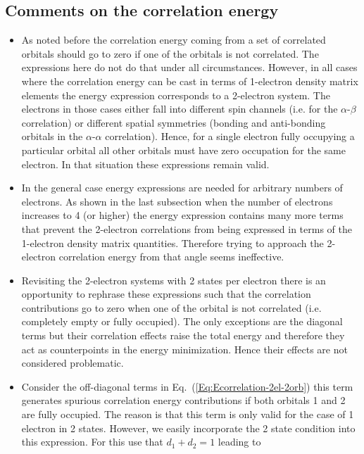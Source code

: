 \documentclass[aip,graphicx]{revtex4-1}
\begin{document}
\subsection{Comments on the correlation energy}
\label{Sec:Comments}

\begin{itemize}
\item As noted before the correlation energy coming from a set of correlated orbitals should go to zero if one of the orbitals is not correlated. The expressions here do not do that under all circumstances. However, in all cases where the correlation energy can be cast in terms of 1-electron density matrix elements the energy expression corresponds to a 2-electron system. The electrons in those cases either fall into different spin channels (i.e. for the $\alpha$-$\beta$ correlation) or different spatial symmetries (bonding and anti-bonding orbitals in the $\alpha$-$\alpha$ correlation). Hence, for a single electron fully occupying a particular orbital all other orbitals must have zero occupation for the same electron. In that situation these expressions remain valid.
\item In the general case energy expressions are needed for arbitrary numbers of electrons. As shown in the last subsection when the number of electrons increases to 4 (or higher) the energy expression contains many more terms that prevent the 2-electron correlations from being expressed in terms of the 1-electron density matrix quantities. Therefore trying to approach the 2-electron correlation energy from that angle seems ineffective. 
\item Revisiting the 2-electron systems with 2 states per electron there is an opportunity to rephrase these expressions such that the correlation contributions go to zero when one of the orbital is not correlated (i.e. completely empty or fully occupied). The only exceptions are the diagonal terms but their correlation effects raise the total energy and therefore they act as counterpoints in the energy minimization. Hence their effects are not considered problematic.
\item Consider the off-diagonal terms in Eq.~(\ref{Eq:Ecorrelation-2el-2orb}) this term generates spurious correlation energy contributions if both orbitals 1 and 2 are fully occupied. The reason is that this term is only valid for the case of 1 electron in 2 states. However, we easily incorporate the 2 state condition into this expression. For this use that $d_1+d_2 = 1$ leading to 
\begin{eqnarray}

\end{eqnarray}
\end{itemize}
\end{document}
